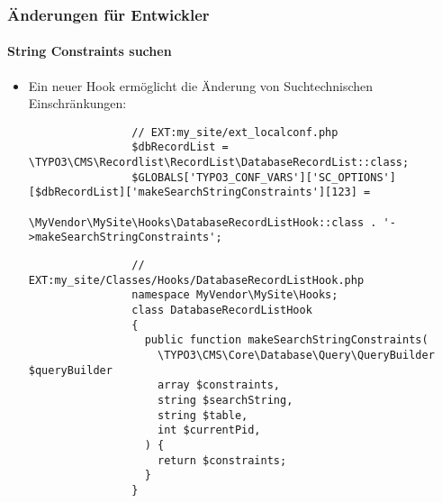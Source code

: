 
\begin{frame}[fragile]
	\frametitle{Änderungen für Entwickler}
	\framesubtitle{String Constraints suchen}

	\lstset{basicstyle=\tiny\ttfamily}

	\begin{itemize}
		\item Ein neuer Hook ermöglicht die Änderung von Suchtechnischen Einschränkungen:

			\begin{lstlisting}
				// EXT:my_site/ext_localconf.php
				$dbRecordList = \TYPO3\CMS\Recordlist\RecordList\DatabaseRecordList::class;
				$GLOBALS['TYPO3_CONF_VARS']['SC_OPTIONS'][$dbRecordList]['makeSearchStringConstraints'][123] =
				  \MyVendor\MySite\Hooks\DatabaseRecordListHook::class . '->makeSearchStringConstraints';
			\end{lstlisting}

			\begin{lstlisting}
				// EXT:my_site/Classes/Hooks/DatabaseRecordListHook.php
				namespace MyVendor\MySite\Hooks;
				class DatabaseRecordListHook
				{
				  public function makeSearchStringConstraints(
				    \TYPO3\CMS\Core\Database\Query\QueryBuilder $queryBuilder
				    array $constraints,
				    string $searchString,
				    string $table,
				    int $currentPid,
				  ) {
				    return $constraints;
				  }
				}
			\end{lstlisting}

	\end{itemize}

\end{frame}


